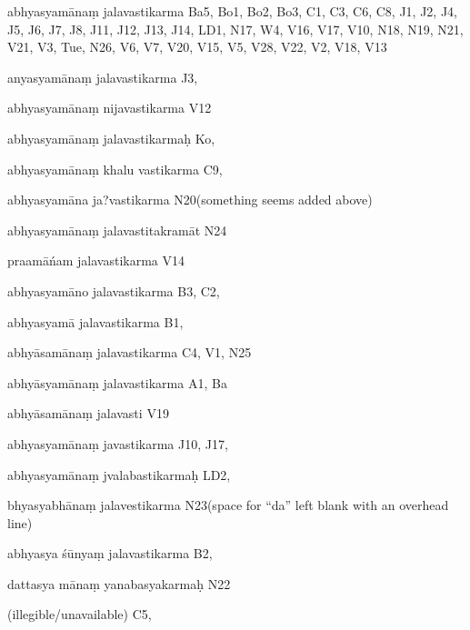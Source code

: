 \begin{ekdosis}
\begin{marma}[hp01_055]
\begin{marma}[hp02_009]
\begin{marma}[hp02_011]
      \begin{marma}[hp02_29d]
      \item[abhyasyamānaṃ jalavastikarma] Ba5, Bo1, Bo2, Bo3, C1, C3, C6, C8, J1, J2, J4, J5, J6, J7, J8, J11, J12, J13, J14, LD1, N17, W4, V16, V17, V10, N18, N19, N21, V21, V3, Tue, N26, V6, V7, V20, V15, V5, V28, V22, V2, V18, V13
      \item[anyasyamānaṃ jalavastikarma] J3,
      \item[abhyasyamānaṃ nijavastikarma] V12
      \item[abhyasyamānaṃ jalavastikarmaḥ] Ko,
      \item[abhyasyamānaṃ khalu vastikarma] C9,
      \item[abhyasyamāna ja?vastikarma] N20(something seems added above)
      \item[abhyasyamānaṃ jalavastitakramāt] N24
      \item[praamāńam jalavastikarma] V14
      \item[abhyasyamāno jalavastikarma] B3, C2, 
      \item[abhyasyamā jalavastikarma] B1,
      \item[abhyāsamānaṃ jalavastikarma] C4, V1, N25
      \item[abhyāsyamānaṃ jalavastikarma] A1, Ba
      \item[abhyāsamānaṃ jalavasti] V19
      \item[abhyasyamānaṃ javastikarma] J10, J17,
      \item[abhyasyamānaṃ jvalabastikarmaḥ] LD2,
      \item[bhyasyabhānaṃ jalavestikarma] N23(space for “da” left blank with an overhead line)
      \item[abhyasya śūnyaṃ jalavastikarma] B2,
      \item[dattasya mānaṃ yanabasyakarmaḥ] N22
      \item[(illegible/unavailable)] C5,
        \begin{description}

        \end{description}
      \end{marma}


\end{marma}
\end{marma}
\end{marma}
\end{ekdosis}
